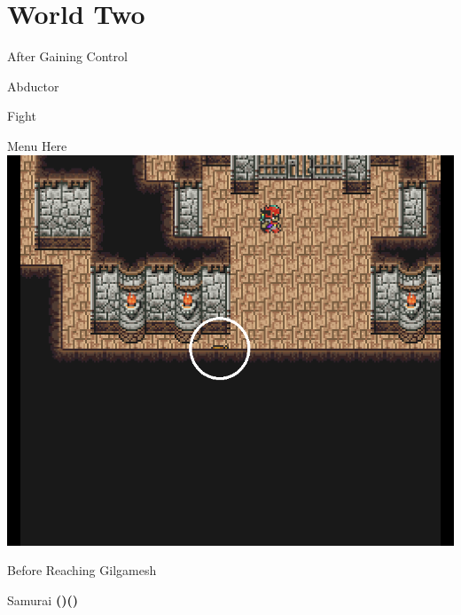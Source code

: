\chapter{World Two}

\vspace{\baselineskip}

\begin{paracol}{2}

\begin{menu}{After Gaining Control}
    \varwb
    \begin{itemMenu}
        \item \cottage
    \end{itemMenu}
    \varwe
\end{menu}

\begin{boss}{Abductor}
	\varwb
	\begin{round}{1}
		\bartz Fight \then {}
    \end{round}
	\varwe
\end{boss}

\switchcolumn*
\begin{misc}{Menu Here}
    \includegraphics[scale=0.157]{../Graphics/Misc/12. Gilgamesh Menu.png}
\end{misc}

\switchcolumn
\begin{menu}{Before Reaching Gilgamesh}
    \varwb
    \begin{jobMenu}
        \galuf Samurai \textbf{(\pointLeft)(\pointDown)} \ability{!\white}
    \end{jobMenu}
    \varwe
\end{menu}


\end{paracol}
